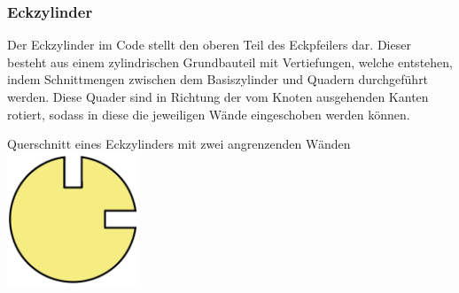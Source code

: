 \subsubsection{Eckzylinder}
Der Eckzylinder im Code  stellt den oberen Teil des Eckpfeilers dar.
Dieser besteht aus einem zylindrischen Grundbauteil mit Vertiefungen, welche entstehen, indem Schnittmengen zwischen dem Basiszylinder und Quadern durchgeführt werden.
Diese Quader sind in Richtung der vom Knoten ausgehenden Kanten rotiert, sodass in diese die jeweiligen Wände eingeschoben werden können.
\begin{Bild}{Querschnitt eines Eckzylinders mit zwei angrenzenden Wänden}
	\includegraphics[height=150px]{Bilder/CornerCylinder2D-06.png}
\end{Bild}

